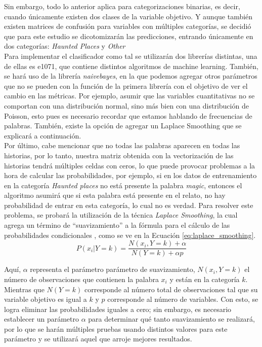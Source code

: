 \documentclass[12pt, letterpaper]{report}
\begin{document}
Sin embargo, todo lo anterior aplica para categorizaciones binarias, es decir, cuando únicamente existen dos clases de la variable objetivo. Y aunque también existen matrices de confusión para variables con múltiples categorías, se decidió que para este estudio se dicotomizarán las predicciones, entrando únicamente en dos categorías: \textit{Haunted Places} y \textit{Other} \\

Para implementar el clasificador como tal se utilizarán dos librerías distintas, una de ellas es e1071, que contiene distintos algoritmos de machine learning. También, se hará uso de la librería \textit{naivebayes}, en la que podemos agregar otros parámetros que no se pueden con la función de la primera librería con el objetivo de ver el cambio en las métricas. Por ejemplo, asumir que las variables cuantitativas no se comportan con una distribución normal, sino más bien con una distribución de Poisson, esto pues es necesario recordar que estamos hablando de frecuencias de palabras. También, existe la opción de agregar un Laplace Smoothing que se explicará a continuación.
\\

Por último, cabe mencionar que no todas las palabras aparecen en todas las historias, por lo tanto, nuestra matriz obtenida con la vectorización de las historias tendrá múltiples celdas con ceros, lo que puede provocar problemas a la hora de calcular las probabilidades, por ejemplo, si en los datos de entrenamiento en la categoría \textit{Haunted places} no está presente la palabra \textit{magic}, entonces el algoritmo asumirá que si esta palabra está presente en el relato, no hay probabilidad de entrar en esta categoría, lo cual no es verdad. Para resolver este problema, se probará la utilización de la técnica \textit{Laplace Smoothing}, la cual agrega un término de “suavizamiento” a la fórmula para el cálculo de las probabilidades condicionales \cite{jayaswal2020}, como se ve en la Ecuación \ref{eq:laplace_smoothing}.
\begin{equation}
\label{eq:laplace_smoothing}
    P(x_i|Y=k)=\frac{N(x_i,Y=k)+\alpha}{N(Y=k)+\alpha p}
\end{equation}

Aquí, $\alpha$ representa el parámetro parámetro de suavizamiento, $N(x_i, Y=k)$ el número de observaciones que contienen la palabra $x_i$ y están en la categoría $k$. Mientras que $N(Y=k)$ corresponde al número total de observaciones tal que su variable objetivo es igual a $k$ y $p$ corresponde al número de variables. Con esto, se logra eliminar las probabilidades iguales a cero; sin embargo, es necesario establecer un parámetro $\alpha$ para determinar qué tanto suavizamiento se realizará, por lo que se harán múltiples pruebas usando distintos valores para este parámetro y se utilizará aquel que arroje mejores resultados.
\end{document}

